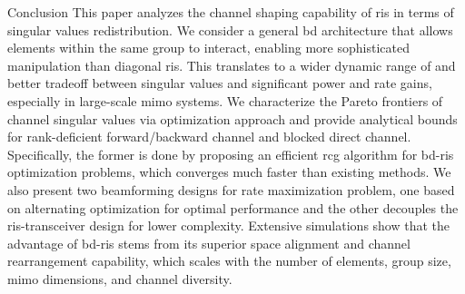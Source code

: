 \documentclass[journal]{IEEEtran}
\begin{document}
\begin{section}{Conclusion}
	This paper analyzes the channel shaping capability of \gls{ris} in terms of singular values redistribution.
	We consider a general \gls{bd} architecture that allows elements within the same group to interact, enabling more sophisticated manipulation than diagonal \gls{ris}.
	This translates to a wider dynamic range of and better tradeoff between singular values and significant power and rate gains, especially in large-scale \gls{mimo} systems.
	We characterize the Pareto frontiers of channel singular values via optimization approach and provide analytical bounds for rank-deficient forward/backward channel and blocked direct channel.
	Specifically, the former is done by proposing an efficient \gls{rcg} algorithm for \gls{bd}-\gls{ris} optimization problems, which converges much faster than existing methods.
	We also present two beamforming designs for rate maximization problem, one based on alternating optimization for optimal performance and the other decouples the \gls{ris}-transceiver design for lower complexity.
	Extensive simulations show that the advantage of \gls{bd}-\gls{ris} stems from its superior space alignment and channel rearrangement capability, which scales with the number of elements, group size, \gls{mimo} dimensions, and channel diversity.

\end{section}

\end{document}
